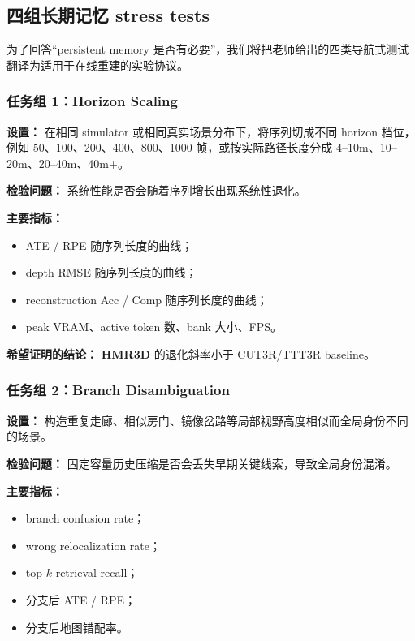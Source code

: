 \documentclass[12pt]{article}
\newcommand{\method}{\textbf{HMR3D}}
\begin{document}
\subsection{四组长期记忆 stress tests}

为了回答“persistent memory 是否有必要”，我们将把老师给出的四类导航式测试翻译为适用于在线重建的实验协议。

\subsubsection{任务组 1：Horizon Scaling}

\textbf{设置：}
在相同 simulator 或相同真实场景分布下，将序列切成不同 horizon 档位，例如 50、100、200、400、800、1000 帧，或按实际路径长度分成 4--10m、10--20m、20--40m、40m+。

\textbf{检验问题：}
系统性能是否会随着序列增长出现系统性退化。

\textbf{主要指标：}
\begin{itemize}
  \item ATE / RPE 随序列长度的曲线；
  \item depth RMSE 随序列长度的曲线；
  \item reconstruction Acc / Comp 随序列长度的曲线；
  \item peak VRAM、active token 数、bank 大小、FPS。
\end{itemize}

\textbf{希望证明的结论：}
\method{} 的退化斜率小于 CUT3R/TTT3R baseline。

\subsubsection{任务组 2：Branch Disambiguation}

\textbf{设置：}
构造重复走廊、相似房门、镜像岔路等局部视野高度相似而全局身份不同的场景。

\textbf{检验问题：}
固定容量历史压缩是否会丢失早期关键线索，导致全局身份混淆。

\textbf{主要指标：}
\begin{itemize}
  \item branch confusion rate；
  \item wrong relocalization rate；
  \item top-$k$ retrieval recall；
  \item 分支后 ATE / RPE；
  \item 分支后地图错配率。
\end{itemize}
\end{document}

